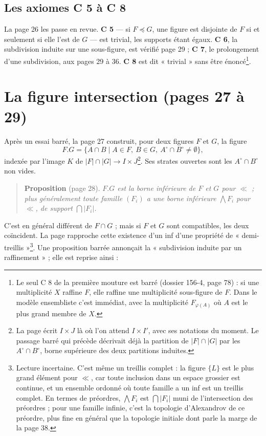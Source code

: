 \documentclass[11pt,a4paper]{article}
\begin{document}
\subsection*{Les axiomes C 5 à C 8}

La page 26 les passe en revue. \textbf{C 5} --- si $F \preccurlyeq G$, une
figure est disjointe de $F$ si et seulement si elle l'est de $G$ --- est
trivial, les supports étant égaux. \textbf{C 6}, la subdivision induite sur une
sous-figure, est vérifié page 29 ; \textbf{C 7}, le prolongement d'une
subdivision, aux pages 29 à 36. \textbf{C 8} est dit « trivial » sans être
énoncé\footnote{Le seul C 8 de la première mouture est barré (dossier 156-4,
page 78) : si une multiplicité $X$ raffine $F$, elle raffine une multiplicité
sous-figure de $F$. Dans le modèle ensembliste c'est immédiat, avec la
multiplicité $F_{\varphi(A)}$ où $A$ est le plus grand membre de $X$.}.

\section*{La figure intersection (pages 27 à 29)}

Après un essai barré, la page 27 construit, pour deux figures $F$ et $G$, la
figure
\[
F.G = \{A \cap B \mid A \in F,\ B \in G,\ A^{\circ} \cap B^{\circ} \neq
\emptyset\},
\]
indexée par l'image $K$ de $|F| \cap |G| \to I \times J$\footnote{La page écrit
$I \times J$ là où l'on attend $I \times I'$, avec ses notations du moment. Le
passage barré qui précède décrivait déjà la partition de $|F| \cap |G|$ par les
$A^{\circ} \cap B^{\circ}$, borne supérieure des deux partitions induites.}.
Ses strates ouvertes sont les $A^{\circ} \cap B^{\circ}$ non vides.

\begin{quote}
\textbf{Proposition} (page 28). \emph{$F.G$ est la borne inférieure de $F$ et
$G$ pour $\ll$ ; plus généralement toute famille $(F_{i})$ a une borne
inférieure $\bigwedge F_{i}$ pour $\ll$, de support $\bigcap |F_{i}|$.}
\end{quote}

C'est en général différent de $F \cap G$ ; mais si $F$ et $G$ sont
compatibles, les deux coïncident. La page rapproche cette existence d'un inf
d'une propriété de « demi-treillis »\footnote{Lecture incertaine. C'est même un
treillis complet : la figure $\{L\}$ est le plus grand élément pour $\ll$, car
toute inclusion dans un espace grossier est continue, et un ensemble ordonné
où toute famille a un inf est un treillis complet. En termes de préordres,
$\bigwedge F_{i}$ est $\bigcap |F_{i}|$ muni de l'intersection des préordres ;
pour une famille infinie, c'est la topologie d'Alexandrov de ce préordre, plus
fine en général que la topologie initiale dont parle la marge de la page 38.}.
Une proposition barrée annonçait la « subdivision induite par un raffinement » ;
elle est reprise ainsi :
\end{document}
